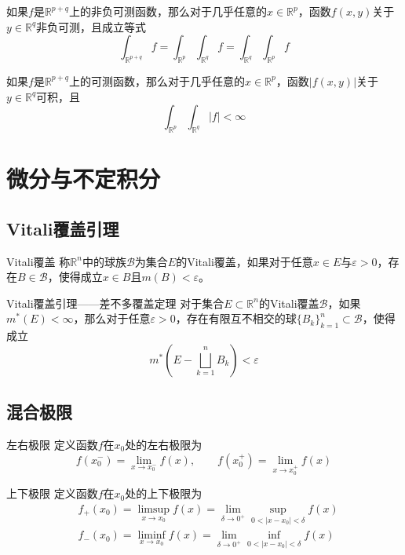 \documentclass[lang = cn, scheme = chinese, thmcnt = section]{elegantbook}
\newcommand{\R}{\mathbb{R}}            %
\newcommand{\sub}{\subset}             %
\begin{document}
\begin{corollary}
	如果$f$是$\R^{p+q}$上的非负可测函数，那么对于几乎任意的$x\in\R^p$，函数$f(x,y)$关于$y\in\R^q$非负可测，且成立等式
	$$
	\int_{\R^{p+q}}f=\int_{\R^p}\int_{\R^q}f=\int_{\R^q}\int_{\R^p}f
	$$
\end{corollary}

\begin{corollary}
	如果$f$是$\R^{p+q}$上的可测函数，那么对于几乎任意的$x\in\R^p$，函数$|f(x,y)|$关于$y\in\R^q$可积，且
	$$
	\int_{\R^p}\int_{\R^q}|f|<\infty
	$$
\end{corollary}

\section{微分与不定积分}

\subsection{Vitali覆盖引理}

\begin{definition}{Vitali覆盖}
	称$\R^n$中的球族$\mathscr{B}$为集合$E$的Vitali覆盖，如果对于任意$x\in E$与$\varepsilon>0$，存在$B\in \mathscr{B}$，使得成立$x\in B$且$m(B)<\varepsilon$。
\end{definition}

\begin{theorem}{Vitali覆盖引理——差不多覆盖定理}
	对于集合$E\sub \R^n$的Vitali覆盖$\mathscr{B}$，如果$m^*(E)<\infty$，那么对于任意$\varepsilon>0$，存在有限互不相交的球$\{ B_k \}_{k=1}^{n}\sub \mathscr{B}$，使得成立
	$$
	m^*\left(E- \bigsqcup_{k=1}^{n}B_k\right)<\varepsilon
	$$
\end{theorem}

\subsection{混合极限}

\begin{definition}{左右极限}
	定义函数$f$在$x_0$处的左右极限为%
	$$
	f(x_0^-)=\lim_{x\to x_0^-}f(x),\qquad 
	f(x_0^+)=\lim_{x\to x_0^+}f(x)
	$$
\end{definition}

\begin{definition}{上下极限}
	定义函数$f$在$x_0$处的上下极限为%
	\begin{align*}
		& f_+(x_0)=\limsup_{x\to x_0}f(x)=\lim_{\delta\to 0^+}\sup_{0<|x-x_0|<\delta}f(x)\\
		& f_-(x_0)=\liminf_{x\to x_0}f(x)=\lim_{\delta\to 0^+}\inf_{0<|x-x_0|<\delta}f(x)
	\end{align*}
\end{definition}
\end{document}
